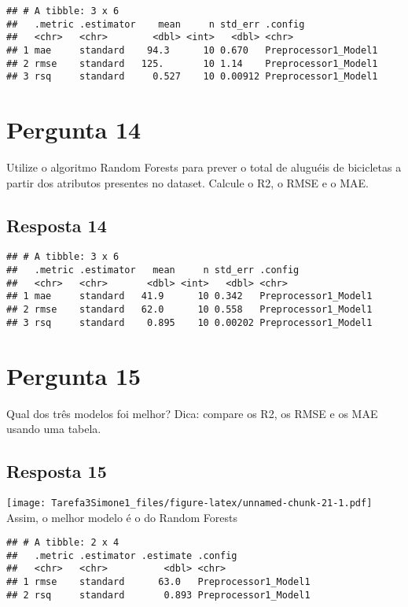 \documentclass[
]{article}
\begin{document}
\begin{verbatim}
## # A tibble: 3 x 6
##   .metric .estimator    mean     n std_err .config             
##   <chr>   <chr>        <dbl> <int>   <dbl> <chr>               
## 1 mae     standard    94.3      10 0.670   Preprocessor1_Model1
## 2 rmse    standard   125.       10 1.14    Preprocessor1_Model1
## 3 rsq     standard     0.527    10 0.00912 Preprocessor1_Model1
\end{verbatim}

\hypertarget{pergunta-14}{%
\section{Pergunta 14}\label{pergunta-14}}

Utilize o algoritmo Random Forests para prever o total de aluguéis de
bicicletas a partir dos atributos presentes no dataset. Calcule o R2, o
RMSE e o MAE.

\hypertarget{resposta-14}{%
\subsection{Resposta 14}\label{resposta-14}}

\begin{verbatim}
## # A tibble: 3 x 6
##   .metric .estimator   mean     n std_err .config             
##   <chr>   <chr>       <dbl> <int>   <dbl> <chr>               
## 1 mae     standard   41.9      10 0.342   Preprocessor1_Model1
## 2 rmse    standard   62.0      10 0.558   Preprocessor1_Model1
## 3 rsq     standard    0.895    10 0.00202 Preprocessor1_Model1
\end{verbatim}

\hypertarget{pergunta-15}{%
\section{Pergunta 15}\label{pergunta-15}}

Qual dos três modelos foi melhor? Dica: compare os R2, os RMSE e os MAE
usando uma tabela.

\hypertarget{resposta-15}{%
\subsection{Resposta 15}\label{resposta-15}}

\texttt{[image: Tarefa3Simone1\_files/figure-latex/unnamed-chunk-21-1.pdf]}
Assim, o melhor modelo é o do Random Forests

\begin{verbatim}
## # A tibble: 2 x 4
##   .metric .estimator .estimate .config             
##   <chr>   <chr>          <dbl> <chr>               
## 1 rmse    standard      63.0   Preprocessor1_Model1
## 2 rsq     standard       0.893 Preprocessor1_Model1
\end{verbatim}
\end{document}
